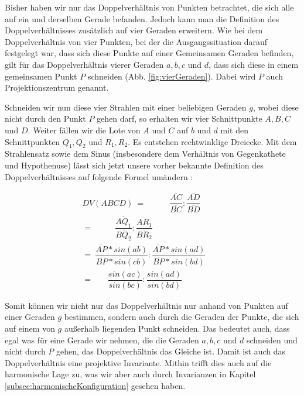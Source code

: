 \documentclass[12pt,a4paper]{article}
\begin{document}
Bisher haben wir nur das Doppelverhältnis von Punkten betrachtet, die sich alle auf ein und derselben Gerade befanden. Jedoch kann man die Definition des Doppelverhältnisses zusätzlich auf vier Geraden erweitern. Wie bei dem Doppelverhältnis von vier Punkten, bei der die Ausgangssituation darauf festgelegt war, dass sich diese Punkte auf einer Gemeinsamen Geraden befinden, gilt für das Doppelverhältnis vierer Geraden $a, b, c$ und $d$, dass sich diese in einem gemeinsamen Punkt $P$ schneiden (Abb. \ref{fig:vierGeraden}). Dabei wird $P$ auch Projektionszentrum genannt.

Schneiden wir nun diese vier Strahlen mit einer beliebigen Geraden $g$, wobei diese nicht durch den Punkt $P$ gehen darf, so erhalten wir vier Schnittpunkte $A, B, C$ und $D$. Weiter fällen wir die Lote von $A$ und $C$ auf $b$ und $d$ mit den Schnittpunkten $Q_1, Q_2$ und $R_1, R_2$. Es entstehen rechtwinklige Dreiecke. Mit dem Strahlensatz sowie dem Sinus (insbesondere dem Verhältnis von Gegenkathete und Hypothenuse) lässt sich jetzt unsere vorher bekannte Definition des Doppelverhältnisses auf folgende Formel umändern \citep[s.~][S.~80]{projektiveGeometrie}: 

\begin{equation*}
\begin{split}
DV(A B C D)~=~~~~~~~~~~~~~\dfrac{\overline{A C}}{\overline{B C}} : \dfrac{\overline{A D}}{\overline{B D}}~~~~~~~~~~~~\\
=~~~~~~~~~~~~\dfrac{\overline{A Q_1}}{\overline{B Q_2}} : \dfrac{\overline{A R_1}}{\overline{B R_2}}~~~~~~~~~~~\\
=~\dfrac{\overline{A P} * sin(ab)}{\overline{B P} * sin(cb)} : \dfrac{\overline{A P} * sin(ad)}{\overline{B P} * sin(bd)} \\
=~~~~~~~~\dfrac{sin(ac)}{sin(bc)} : \dfrac{sin(ad)}{sin(bd)}~~~~~~~~
\end{split}
\end{equation*}

Somit können wir nicht nur das Doppelverhältnis nur anhand von Punkten auf einer Geraden $g$ bestimmen, sondern auch durch die Geraden der Punkte, die sich auf einem von $g$ außerhalb liegenden Punkt schneiden. Das bedeutet auch, dass egal was für eine Gerade wir nehmen, die die Geraden $a, b, c$ und $d$ schneiden und nicht durch $P$ gehen, das Doppelverhältnis das Gleiche ist. Damit ist auch das Doppelverhältnis eine projektive Invariante. Mithin trifft dies auch auf die harmonische Lage zu, was wir aber auch durch Invarianzen in Kapitel \ref{subsec:harmonischeKonfiguration} gesehen haben.
\end{document}
